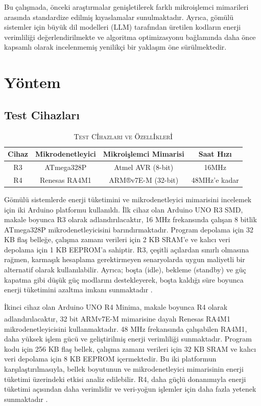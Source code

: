 \documentclass[conference, a4paper]{IEEEtran}
\begin{document}
Bu çalışmada, önceki araştırmalar genişletilerek farklı mikroişlemci mimarileri arasında standardize edilmiş kıyaslamalar sunulmaktadır. Ayrıca, gömülü sistemler için büyük dil modelleri (LLM) tarafından üretilen kodların enerji verimliliği değerlendirilmekte ve algoritma optimizasyonu bağlamında daha önce kapsamlı olarak incelenmemiş yenilikçi bir yaklaşım öne sürülmektedir.

\section{Yöntem}

\subsection{Test Cihazları}

\begin{table}[ph]
  \centering
  \caption{\textsc{Test C{\footnotesize İ}hazları ve Özell{\footnotesize İ}kler{\footnotesize İ}}}
  \label{tab:test-cihazlar}
  \begin{tabular}{|c|c|c|c|}
    \hline
    {Cihaz} & {Mikrodenetleyici} & {Mikroişlemci Mimarisi} & {Saat Hızı} \\
    \hline
    R3 & ATmega328P & Atmel AVR (8-bit) & 16MHz \\
    \hline
    R4 & Renesas RA4M1 & ARM®v7E-M (32-bit) & 48MHz'e kadar \\
    \hline
  \end{tabular}
\end{table}

Gömülü sistemlerde enerji tüketimini ve mikrodenetleyici mimarisini incelemek için iki Arduino platformu kullanıldı. İlk cihaz olan Arduino UNO R3 SMD, makale boyunca R3 olarak adlandırılacaktır, 16 MHz frekansında çalışan 8 bitlik ATmega328P mikrodenetleyicisini barındırmaktadır. Program depolama için 32 KB flaş belleğe, çalışma zamanı verileri için 2 KB SRAM'e ve kalıcı veri depolama için 1 KB EEPROM'a sahiptir. R3, çeşitli açılardan sınırlı olmasına rağmen, karmaşık hesaplama gerektirmeyen senaryolarda uygun maliyetli bir alternatif olarak kullanılabilir. Ayrıca; boşta (idle), bekleme (standby) ve güç kapatma gibi düşük güç modlarını destekleyerek, boşta kaldığı süre boyunca enerji tüketimini azaltma imkanı sunmaktadır \cite{atmega328p-datasheet}.

İkinci cihaz olan Arduino UNO R4 Minima, makale boyunca R4 olarak adlandırılacaktır, 32 bit ARM\textsuperscript \textregistered v7E-M mimarisine dayalı Renesas RA4M1 mikrodenetleyicisini kullanmaktadır. 48 MHz frekansında çalışabilen RA4M1, daha yüksek işlem gücü ve geliştirilmiş enerji verimliliği sunmaktadır. Program kodu için 256 KB flaş bellek, çalışma zamanı verileri için 32 KB SRAM ve kalıcı veri depolama için 8 KB EEPROM içermektedir. Bu iki platformun karşılaştırılmasıyla, bellek boyutunun ve mikrodenetleyici mimarisinin enerji tüketimi üzerindeki etkisi analiz edilebilir. R4, daha güçlü donanımıyla enerji tüketimi açısından daha verimlidir ve veri-yoğun işlemler için daha fazla yetenek sunmaktadır \cite{ra4m1-datasheet}.
\end{document}
